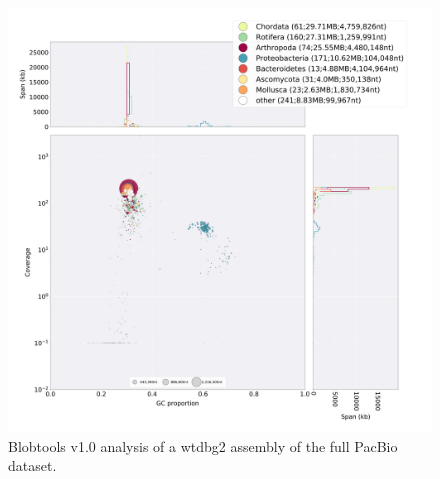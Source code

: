 \begin{suppsection}
 \begin{figure}[ht]
    \centering
     \includegraphics[width=15cm]{fig/benchmark/PB_WTDBG.png}
   \caption{Blobtools v1.0 analysis of a wtdbg2 assembly of the full PacBio dataset.}
   \label{fig:blobtools_wtdbg2_pb}
 \end{figure}


\end{suppsection}
